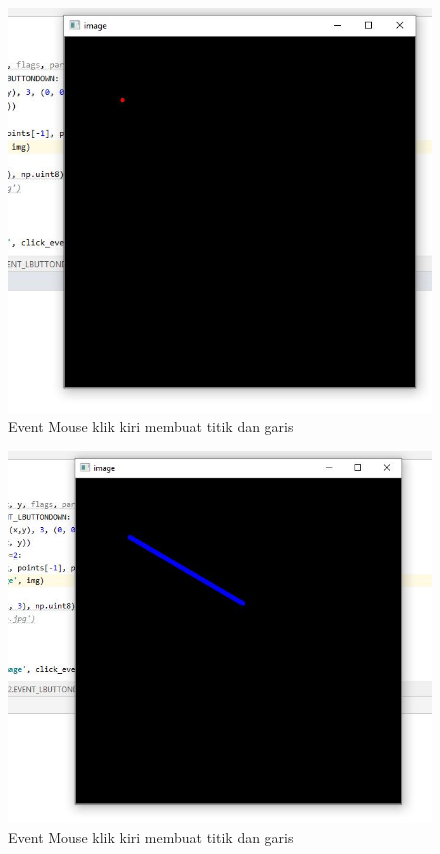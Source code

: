 \newpage
\begin{figure}[ht]
\centering
\includegraphics[scale=0.5]{figures/2,23.jpg}
\caption{Event Mouse klik kiri membuat titik dan garis}
\label{contoh}
\end{figure}

\begin{figure}[ht]
\centering
\includegraphics[scale=0.4]{figures/2,23,1.jpg}
\caption{Event Mouse klik kiri membuat titik dan garis}
\label{contoh}
\end{figure}

